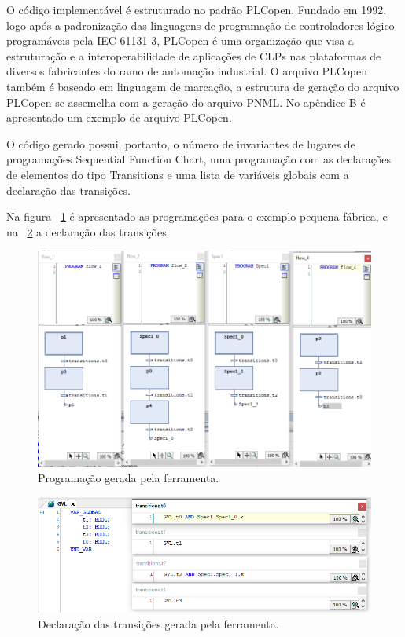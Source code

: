 O c\'odigo implement\'avel \'e estruturado no padr\~ao PLCopen. Fundado em 1992, logo ap\'os a padroniza\c{c}\~ao das linguagens de programa\c{c}\~ao de controladores l\'ogico program\'aveis pela IEC 61131-3, PLCopen \'e uma organiza\c{c}\~ao que visa a estrutura\c{c}\~ao e a interoperabilidade de aplica\c{c}\~oes de CLPs nas plataformas de diversos fabricantes do ramo de automa\c{c}\~ao industrial. O arquivo PLCopen tamb\'em \'e baseado em linguagem de marca\c{c}\~ao, a estrutura de gera\c{c}\~ao do arquivo PLCopen se assemelha com a gera\c{c}\~ao do arquivo PNML. No ap\^endice B \'e apresentado um exemplo de arquivo PLCopen.

O c\'odigo gerado possui, portanto, o n\'umero de invariantes de lugares de programa\c{c}\~oes Sequential Function Chart, uma programa\c{c}\~ao com as declara\c{c}\~oes de elementos do tipo Transitions e uma lista de vari\'aveis globais com a declara\c{c}\~ao das transi\c{c}\~oes.

Na figura ~\ref{fig:pqnafabricasfcs} \'e apresentado as programa\c{c}\~oes para o exemplo pequena f\'abrica, e na ~\ref{fig:pqnafabricagvl} a declara\c{c}\~ao das transi\c{c}\~oes.

\begin{figure}[!htb]
	\caption[Programa\c{c}\~ao gerada pela ferramenta.]{Programa\c{c}\~ao gerada pela ferramenta.}
	\label{fig:pqnafabricasfcs}
	\includegraphics[width=16cm]{./figuras/PQNAFABSFCS.png}\centering
\end{figure}

\begin{figure}[!htb]
	\caption[Declara\c{c}\~ao das transi\c{c}\~oes gerada pela ferramenta.]{Declara\c{c}\~ao das transi\c{c}\~oes gerada pela ferramenta.}
	\label{fig:pqnafabricagvl}
	\includegraphics[width=16cm]{./figuras/PQNAFABGVL.png}\centering
\end{figure}
